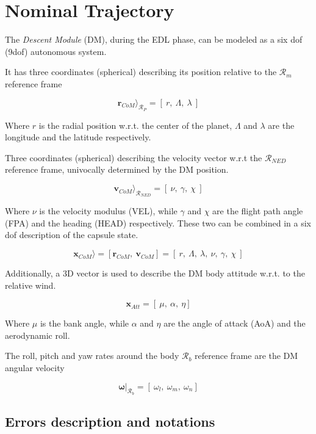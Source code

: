 \chapter{Nominal Trajectory}

The \textit{Descent Module} (DM), during the EDL phase, can be modeled as a
six dof (9dof) autonomous system.

It has three coordinates (spherical) describing its position relative to the
$\mathcal{R}_{m}$ reference frame

        $$
            \textbf{r}_{CoM}\rangle_{\mathcal{R}_{P}} = [\: r,\:\Lambda,\:\lambda \:]
        $$

\noindent Where $r$ is the radial position w.r.t. the center of the planet, $\Lambda$ and $\lambda$ are 
the longitude and the latitude respectively.

Three coordinates (spherical) describing the velocity vector w.r.t the $\mathcal{R}_{NED}$ reference frame, univocally
determined by the DM position.

        $$
            \textbf{v}_{CoM}\rangle_{\mathcal{R}_{NED}} = [\: \nu,\:\gamma,\:\chi \:]
        $$

\noindent Where $\nu$ is the velocity modulus (VEL), while $\gamma$ and $\chi$ are the flight
path angle (FPA) and the heading (HEAD) respectively.
These two can be combined in a six dof description of the capsule state.

        $$
            \textbf{x}_{CoM}\rangle = [\textbf{r}_{CoM},\: \textbf{v}_{CoM}] = [\: r,\:\Lambda,\:\lambda, \: \nu,\:\gamma,\:\chi \:]
        $$

Additionally, a 3D vector is used to describe the DM body attitude w.r.t. to the relative wind.

        $$
            \textbf{x}_{Att} = [\: \mu,\: \alpha,\: \eta]
        $$

\noindent Where $\mu$ is the bank angle, while $\alpha$ and $\eta$ are the 
angle of attack (AoA) and the aerodynamic roll.

The roll, pitch and yaw rates around the body $\mathcal{R}_{b}$ reference frame are the DM angular velocity

        $$
            \boldsymbol{\omega}|_{\mathcal{R}_{b}} = [\: \omega_l,\: \omega_m,\: \omega_n]
        $$

\newpage

\section{Errors description and notations}

